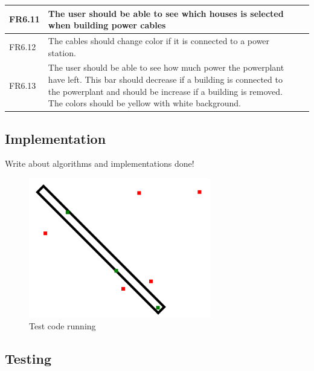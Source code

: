 \begin{tabular}{| p{1.2cm} | p{8cm} | p{3cm} |}
		FR6.11 & The user should be able to see which houses is selected when 
		building power cables & \\ \hline

		FR6.12 & The cables should change color if it is connected to a power 
		station. & \\ \hline

		FR6.13 & The user should be able to see how much power the powerplant have 
		left. This bar should decrease if a building is connected to the powerplant 
		and should be increase if a building is removed. The colors should be yellow 
		with white background. & \\ \hline

	\end{tabular}

\subsection{Implementation}

	Write about algorithms and implementations done!
	
	\begin{figure}[H]
		\includegraphics[scale=0.6]{pictures/touchInStroke.png}
		\caption{Test code running}
	\end{figure}

\subsection{Testing}


